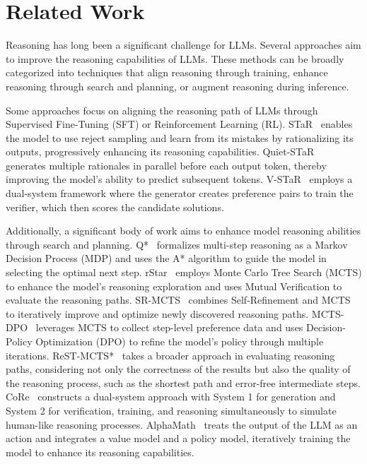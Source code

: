 \section{Related Work}
\label{sec:related}

Reasoning has long been a significant challenge for LLMs. 
Several approaches aim to improve the reasoning capabilities of LLMs. 
These methods can be broadly categorized into techniques that align reasoning through training, enhance reasoning through search and planning, or augment reasoning during inference.

Some approaches focus on aligning the reasoning path of LLMs through Supervised Fine-Tuning (SFT) or Reinforcement Learning (RL).
STaR~\citep{zelikman2022star} enables the model to use reject sampling and learn from its mistakes by rationalizing its outputs, progressively enhancing its reasoning capabilities. 
Quiet-STaR~\citep{zelikman2024quiet} generates multiple rationales in parallel before each output token, thereby improving the model's ability to predict subsequent tokens.
V-STaR~\citep{hosseini2024v} employs a dual-system framework where the generator creates preference pairs to train the verifier, which then scores the candidate solutions.

Additionally, a significant body of work aims to enhance model reasoning abilities through search and planning. 
Q*~\citep{wang2024q} formalizes multi-step reasoning as a Markov Decision Process (MDP) and uses the A* algorithm to guide the model in selecting the optimal next step. 
rStar~\citep{qi2024mutual} employs Monte Carlo Tree Search (MCTS) to enhance the model's reasoning exploration and uses Mutual Verification to evaluate the reasoning paths. 
SR-MCTS~\citep{zhang2024llama} combines Self-Refinement and MCTS to iteratively improve and optimize newly discovered reasoning paths. 
MCTS-DPO~\citep{xie2024monte} leverages MCTS to collect step-level preference data and uses Decision-Policy Optimization (DPO) to refine the model’s policy through multiple iterations. 
ReST-MCTS*~\citep{zhang2025rest} takes a broader approach in evaluating reasoning paths, considering not only the correctness of the results but also the quality of the reasoning process, such as the shortest path and error-free intermediate steps. 
CoRe~\citep{zhu2022solving} constructs a dual-system approach with System 1 for generation and System 2 for verification, training, and reasoning simultaneously to simulate human-like reasoning processes. 
AlphaMath~\citep{chen2024alphamath} treats the output of the LLM as an action and integrates a value model and a policy model, iteratively training the model to enhance its reasoning capabilities.

